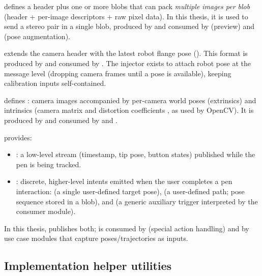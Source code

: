  defines a  header plus one or more blobs that can pack \emph{multiple images per blob} (header + per-image descriptors + raw pixel data). In this thesis, it is used to send a stereo pair in a single blob, produced by  and consumed by  (preview) and  (pose augmentation).

 extends the camera header with the latest robot flange pose (). This format is produced by  and consumed by . The injector exists to attach robot pose at the message level (dropping camera frames until a pose is available), keeping calibration inputs self-contained.

 defines : camera images accompanied by per-camera world poses (extrinsics) and intrinsics (camera matrix  and distortion coefficients , as used by OpenCV). It is produced by  and consumed by  and .

 provides:
\begin{itemize}
    \item {}: a low-level stream (timestamp, tip pose, button states) published while the pen is being tracked.
    \item {}: discrete, higher-level intents emitted when the user completes a pen interaction:  (a single user-defined target pose),  (a user-defined path; pose sequence stored in a blob), and  (a generic auxiliary trigger interpreted by the consumer module).
\end{itemize}
In this thesis,  publishes both;  is consumed by  (special action handling) and by use case modules that capture poses/trajectories as  inputs.


\subsection{Implementation helper utilities} \label{sec:ch3_shared_helper_utilities}

